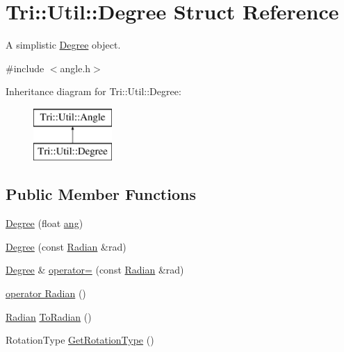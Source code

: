 \hypertarget{struct_tri_1_1_util_1_1_degree}{}\section{Tri\+:\+:Util\+:\+:Degree Struct Reference}
\label{struct_tri_1_1_util_1_1_degree}


A simplistic \hyperlink{struct_tri_1_1_util_1_1_degree}{Degree} object.  




{\ttfamily \#include $<$angle.\+h$>$}

Inheritance diagram for Tri\+:\+:Util\+:\+:Degree\+:\begin{figure}[H]
\begin{center}
\leavevmode
\includegraphics[height=2.000000cm]{struct_tri_1_1_util_1_1_degree}
\end{center}
\end{figure}
\subsection*{Public Member Functions}
\begin{DoxyCompactItemize}
\item 
\hyperlink{struct_tri_1_1_util_1_1_degree_a6c3a895b6e1909e8198b9b48d34a2daa}{Degree} (float \hyperlink{struct_tri_1_1_util_1_1_angle_a38c78e367d283762e443cc630c021a0d}{ang})
\item 
\hyperlink{struct_tri_1_1_util_1_1_degree_a7763fb3f0ea047235c7c1bea3b23d7ed}{Degree} (const \hyperlink{struct_tri_1_1_util_1_1_radian}{Radian} \&rad)
\item 
\hyperlink{struct_tri_1_1_util_1_1_degree}{Degree} \& \hyperlink{struct_tri_1_1_util_1_1_degree_af113b4b4965f61c6acccfed43df24f9b}{operator=} (const \hyperlink{struct_tri_1_1_util_1_1_radian}{Radian} \&rad)
\item 
\hyperlink{struct_tri_1_1_util_1_1_degree_a68a03a2517f8bd7b2b5e7f204e356d8c}{operator Radian} ()
\item 
\hyperlink{struct_tri_1_1_util_1_1_radian}{Radian} \hyperlink{struct_tri_1_1_util_1_1_degree_a755f309d469cddfa094ce3a0ad392b0a}{To\+Radian} ()
\item 
Rotation\+Type \hyperlink{struct_tri_1_1_util_1_1_degree_add6644b782cbe8eb1011bc70832e6f09}{Get\+Rotation\+Type} ()
\end{DoxyCompactItemize}
